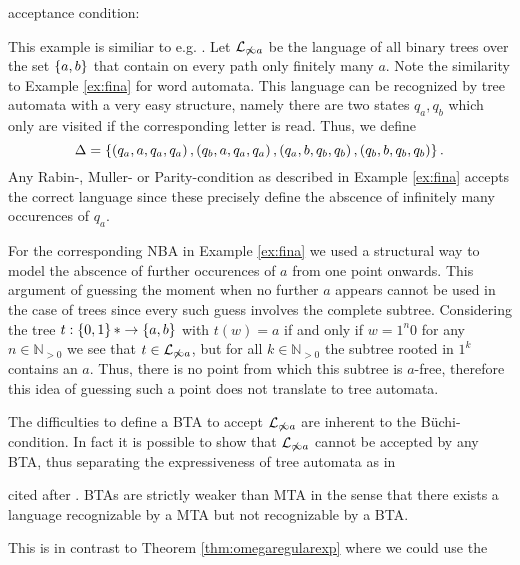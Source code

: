 acceptance condition:
\begin{example}
  This example is similiar to e.g.
  \cite[Exercise 8.3 and the proof of Theorem 8.6]{AutoLogInfGames}.
  Let $\mathcal{L}_{\not\infty a}$ be the language of all binary trees over the
  set $\left\{a,b\right\}$ that contain on every path only finitely many $a$. Note the
  similarity to Example \ref{ex:fina} for word automata. This
  language can be recognized by tree automata with a very easy structure,
  namely there are two states $q_{a}, q_{b}$ which only are visited if the
  corresponding letter is read. Thus, we define
  \begin{equation*}
    \Delta = \left\{
      \left(q_{a}, a, q_{a}, q_{a}\right),
      \left(q_{b}, a, q_{a}, q_{a}\right),
      \left(q_{a}, b, q_{b}, q_{b}\right),
      \left(q_{b}, b, q_{b}, q_{b}\right)
    \right\}.
  \end{equation*}
  Any Rabin-, Muller- or Parity-condition as described in Example \ref{ex:fina}
  accepts the correct language since these precisely define the abscence of
  infinitely many occurences of $q_{a}$.

  For the corresponding \ac{NBA} in Example \ref{ex:fina} we used a structural
  way to model the abscence of further occurences of $a$ from one point 
  onwards.  This argument of guessing the moment when no further $a$ appears 
  cannot be used in the case of trees since every such guess involves the 
  complete subtree. Considering the tree $t:\left\{0,1\right\}*\rightarrow\left\{a,b\right\}$ 
  with $t(w) = a$ if and only if $w = 1^{n}0$ for any $n\in\mathbb{N}_{>0}$ we 
  see that $t\in\mathcal{L}_{\not\infty a}$, but for all $k\in\mathbb{N}_{>0}$ 
  the subtree rooted in $1^{k}$ contains an $a$. Thus, there is no point from
  which this subtree is $a$-free, therefore this idea of guessing such a point 
  does not translate to tree automata.
\end{example}
The difficulties to define a \ac{BTA} to accept $\mathcal{L}_{\not\infty a}$ 
are inherent to the Büchi-condition. In fact it is possible to show that 
$\mathcal{L}_{\not\infty a}$ cannot be accepted by any \ac{BTA}, thus 
separating the expressiveness of tree automata as in
\begin{theorem}
  \cite[Corollary 8]{WeakDefRel} cited after
  \cite[Theorem 8.6]{AutoLogInfGames}.
  \acp{BTA} are strictly weaker than \ac{MTA} in the sense that there exists 
  a language recognizable by a \ac{MTA} but not recognizable by a \ac{BTA}.
\end{theorem}
This is in contrast to Theorem \ref{thm:omegaregularexp} where we could use the
